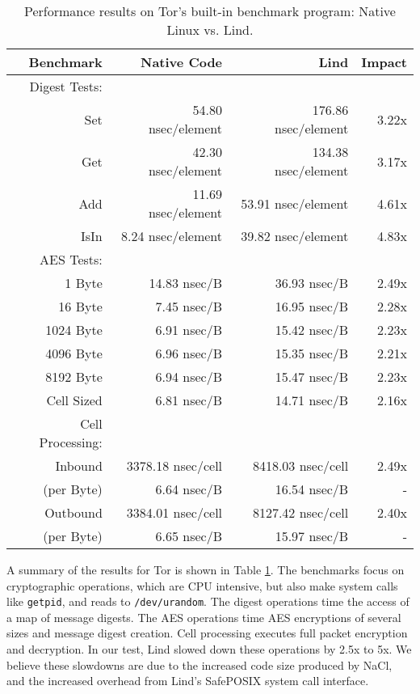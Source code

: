 {{\begin{table}
\centering
\scriptsize
\begin{tabular}{|r|r|r|r|}
  \hline
  {\bf Benchmark} & {\bf Native Code} & {\bf Lind} & {\bf Impact}  \\
  \hline
  Digest Tests: & & & \\
  Set & 54.80 nsec/element & 176.86 nsec/element & 3.22x \\
  Get & 42.30 nsec/element & 134.38 nsec/element & 3.17x \\
  Add & 11.69 nsec/element & 53.91 nsec/element & 4.61x \\
  IsIn & 8.24 nsec/element & 39.82 nsec/element & 4.83x \\
  \hline
  AES Tests: & & & \\
  1 Byte & 14.83 nsec/B & 36.93 nsec/B & 2.49x \\
  16 Byte & 7.45 nsec/B & 16.95 nsec/B & 2.28x \\
  1024 Byte & 6.91 nsec/B & 15.42 nsec/B & 2.23x \\
  4096 Byte & 6.96 nsec/B & 15.35 nsec/B & 2.21x \\
  8192 Byte & 6.94 nsec/B & 15.47 nsec/B & 2.23x \\
  Cell Sized & 6.81 nsec/B & 14.71 nsec/B & 2.16x \\
  \hline
  Cell Processing: & & & \\
  Inbound & 3378.18 nsec/cell & 8418.03 nsec/cell & 2.49x \\
  (per Byte) & 6.64 nsec/B & 16.54 nsec/B & - \\
  Outbound & 3384.01 nsec/cell & 8127.42 nsec/cell & 2.40x \\
  (per Byte) & 6.65 nsec/B & 15.97 nsec/B & - \\
  \hline
\end{tabular}
\caption{\small Performance results on Tor's built-in benchmark program: Native
Linux vs. Lind.}
\label{table:performance_tor}
\end{table}

A summary of the results for Tor is shown in Table \ref{table:performance_tor}. The
benchmarks focus on cryptographic operations,
which are CPU intensive, but also make system calls like \texttt{getpid}, and reads to
\texttt{/dev/urandom}.
The digest operations time the access of a map of message digests.
The AES operations time AES encryptions of several sizes and message
digest creation.
Cell processing executes full packet encryption and decryption. In our
test, Lind slowed down these operations by 2.5x to 5x. We believe these
slowdowns are due to the increased code size produced by NaCl,
and the increased overhead from Lind's SafePOSIX system call interface.

}}
